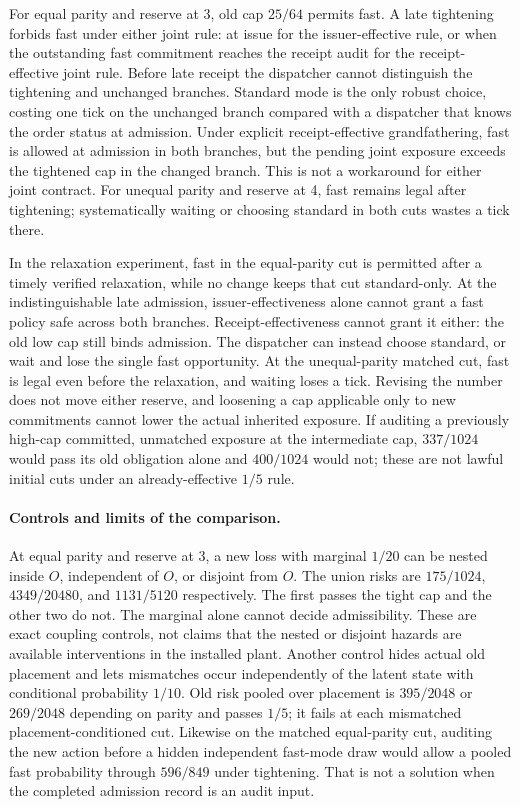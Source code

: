 \documentclass[11pt]{article}
\begin{document}
For equal parity and reserve at 3, old cap $25/64$ permits fast. A late tightening forbids fast under either joint rule: at issue for the issuer-effective rule, or when the outstanding fast commitment reaches the receipt audit for the receipt-effective joint rule. Before late receipt the dispatcher cannot distinguish the tightening and unchanged branches. Standard mode is the only robust choice, costing one tick on the unchanged branch compared with a dispatcher that knows the order status at admission. Under explicit receipt-effective grandfathering, fast is allowed at admission in both branches, but the pending joint exposure exceeds the tightened cap in the changed branch. This is not a workaround for either joint contract. For unequal parity and reserve at 4, fast remains legal after tightening; systematically waiting or choosing standard in both cuts wastes a tick there.

In the relaxation experiment, fast in the equal-parity cut is permitted after a timely verified relaxation, while no change keeps that cut standard-only. At the indistinguishable late admission, issuer-effectiveness alone cannot grant a fast policy safe across both branches. Receipt-effectiveness cannot grant it either: the old low cap still binds admission. The dispatcher can instead choose standard, or wait and lose the single fast opportunity. At the unequal-parity matched cut, fast is legal even before the relaxation, and waiting loses a tick. Revising the number does not move either reserve, and loosening a cap applicable only to new commitments cannot lower the actual inherited exposure. If auditing a previously high-cap committed, unmatched exposure at the intermediate cap, $337/1024$ would pass its old obligation alone and $400/1024$ would not; these are not lawful initial cuts under an already-effective $1/5$ rule.

\paragraph{Controls and limits of the comparison.}
At equal parity and reserve at 3, a new loss with marginal $1/20$ can be nested inside $O$, independent of $O$, or disjoint from $O$. The union risks are $175/1024$, $4349/20480$, and $1131/5120$ respectively. The first passes the tight cap and the other two do not. The marginal alone cannot decide admissibility. These are exact coupling controls, not claims that the nested or disjoint hazards are available interventions in the installed plant. Another control hides actual old placement and lets mismatches occur independently of the latent state with conditional probability $1/10$. Old risk pooled over placement is $395/2048$ or $269/2048$ depending on parity and passes $1/5$; it fails at each mismatched placement-conditioned cut. Likewise on the matched equal-parity cut, auditing the new action before a hidden independent fast-mode draw would allow a pooled fast probability through $596/849$ under tightening. That is not a solution when the completed admission record is an audit input.
\end{document}
